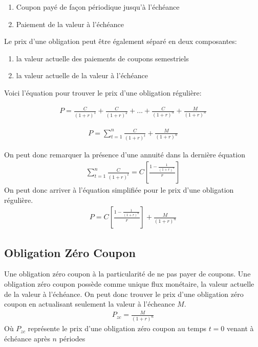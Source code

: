 \documentclass[12pt]{article}
\begin{document}
\begin{enumerate}
\item Coupon payé de façon périodique jusqu'à l'échéance
\item Paiement de la valeur à l'échéance
\end{enumerate}
\vspace{1cm}
Le prix d'une obligation peut être également séparé en deux composantes:

\begin{enumerate}
\item la valeur actuelle des paiements de coupons semestriels
\item la valeur actuelle de la valeur à l'échéance 
\end{enumerate}
\vspace{1cm}
Voici l'équation pour trouver le prix d'une obligation régulière:

\begin{align*}
P=\frac{C}{(1+r)^1}+\frac{C}{(1+r)^2}+...+\frac{C}{(1+r)^n}+\frac{M}{(1+r)^n}
\end{align*}

\begin{align*}
P=\sum_{t=1}^{n} \frac{C}{(1+r)^t}+\frac{M}{(1+r)^n}
\end{align*}

On peut donc remarquer la présence d'une annuité dans la dernière équation 
\begin{align*}
\sum_{t=1}^{n} \frac{C}{(1+r)^t}=C \left[ \frac{1-\frac{1}{(1+r)^n}}{r} \right]
\end{align*}
On peut donc arriver à l'équation simplifiée pour le prix d'une obligation régulière.
\begin{align*}
P=C \left[ \frac{1-\frac{1}{(1+r)^n}}{r} \right]+\frac{M}{(1+r)^n}
\end{align*}
\subsection{Obligation Zéro Coupon}
Une obligation zéro coupon à la particularité de ne pas payer de coupons. Une obligation zéro coupon possède comme unique flux monétaire, la valeur actuelle de la valeur à l'échéance. On peut donc trouver le prix d'une obligation zéro coupon en actualisant seulement la valeur à l'écheance $M$. 
\begin{align*}
P_{zc}=\frac{M}{(1+r)^n}
\end{align*}
Où $P_{zc}$ représente le prix d'une obligation zéro coupon au temps $t=0$ venant à échéance après $n$ périodes 
\end{document}
